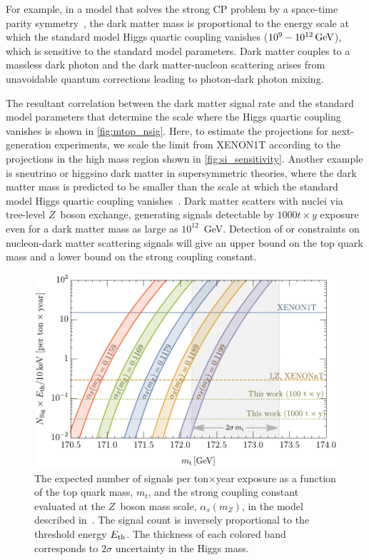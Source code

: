 For example, in a model that solves the strong CP problem by a space-time parity symmetry~\cite{Dunsky:2019api}, the dark matter mass is proportional to the energy scale at which the standard model Higgs quartic coupling vanishes ($10^9-10^{12}\, \mathrm{GeV}$), which is sensitive to the standard model parameters. Dark matter couples to a massless dark photon and the dark matter-nucleon scattering arises from unavoidable quantum corrections leading to photon-dark photon mixing. 

The resultant correlation between the dark matter signal rate and the standard model parameters that determine the scale where the Higgs quartic coupling vanishes is shown in \autoref{fig:mtop_nsig}. Here, to estimate the projections for next-generation experiments, we scale the limit from XENON1T according to the projections in the high mass region shown in \autoref{fig:si_sensitivity}. Another example is sneutrino or higgsino dark matter in supersymmetric theories, where the dark matter mass is predicted to be smaller than the scale at which the standard model Higgs quartic coupling vanishes~\cite{Dunsky:2020yhv}. Dark matter scatters with nuclei via tree-level $Z$~boson exchange, generating signals detectable by $1000t\times y$ exposure even for a dark matter mass as large as $10^{12}$~GeV. Detection of or constraints on nucleon-dark matter scattering signals will give an upper bound on the top quark mass and a lower bound on the strong coupling constant.

\begin{figure}[!htbp]
\centering
\includegraphics[scale=.52]{fig_mtop_nsig.pdf}
\caption{The expected number of signals per ton$\times$year exposure as a function of the top quark mass, $m_t$, and the strong coupling constant evaluated at the $Z$~boson mass scale, $\alpha_s(m_Z)$, in the model described in~\cite{Dunsky:2019api}. The signal count is inversely proportional to the threshold energy $E_{\rm th}$. The thickness of each colored band corresponds to $2\sigma$ uncertainty in the Higgs mass.}
\label{fig:mtop_nsig}
\end{figure}

